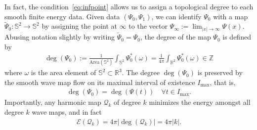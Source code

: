 \documentclass[10pt,reqno]{amsart}
\newcommand{\E}{\mathcal{E}}
\newcommand{\QQ}{\mathcal{Q}}
\newcommand{\C}{\mathbb{C}}
\newcommand{\R}{\mathbb{R}}
\newcommand{\Sp}{\mathbb{S}}
\newcommand{\Z}{\mathbb{Z}}
\newcommand{\om}{\omega}
\newcommand{\ti}{\widetilde}
\newcommand{\abs}[1]{\left\lvert{#1}\right\rvert}
\newcommand{\EQ}[1]{\begin{equation}\begin{split} #1 \end{split}\end{equation}}
\numberwithin{equation}{section}
\theoremstyle{remark}
\newcommand{\0}{\emptyset}
\begin{document}
In fact, the condition~\eqref{eq:infpoint} allows us to assign a topological degree to each smooth finite energy data. Given data  $(\Psi_0, \Psi_1)$, we can  identify $\Psi_0$ with a map $\ti \Psi_0: \Sp^2 \to \Sp^2$ by assigning the point at $\infty$ to the vector $\Psi_\infty:= \lim_{\abs{x} \to \infty} \Psi(x)$. %
Abusing notation slightly by writing $\ti \Psi_0 = \Psi_0$, the degree of the map $\Psi_0$ is defined by
\EQ{
\deg(\Psi_0) :=   \frac{1}{ \textrm{Area}(\Sp^2)} \int_{\Sp^2}  \Psi^*_0( \om) = \frac{1}{ 4\pi} \int_{\R^2}   \Psi_0^*( \om)\in \Z 
}
where $\om$ is the area element  of $\Sp^2 \subset \R^3$. The degree $\deg(\Psi_0)$ is preserved by the smooth wave map flow on its maximal interval of existence $I_{\max}$,  that is, 
\EQ{
\deg( \Psi_0) = \deg(\Psi(t)) \quad \forall t \in I_{\max}. 
}
Importantly, any harmonic map  $\QQ_k$ of degree $k$ minimizes the energy amongst all degree $k$ wave maps, and in fact 
\EQ{
\E(\QQ_k) = 4 \pi \abs{ \deg(\QQ_k) }= 4 \pi \abs{k}. 
}

\end{document}
